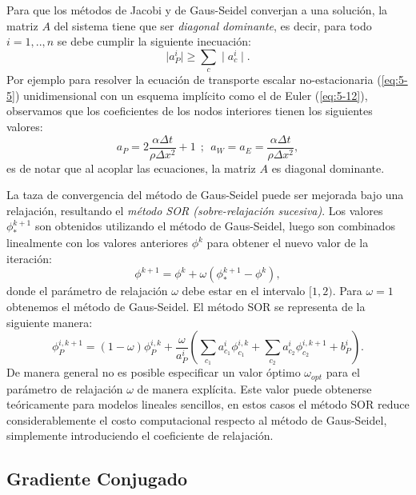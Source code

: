 \documentclass[a4paper,10pt, oneside]{book}
\begin{document}
Para que los métodos de Jacobi y de Gaus-Seidel converjan a una solución, la matriz $A$ del sistema tiene que ser \textit{diagonal dominante}, es decir, para todo $i=1,..,n$ se debe cumplir la siguiente inecuación:
\begin{equation}
	\mid a_P^i \mid \geq \sum_c \mid a_c^i \mid. \nonumber
\end{equation}
Por ejemplo para resolver la ecuación de transporte escalar no-estacionaria (\ref{eq:5-5}) unidimensional con un esquema implícito como el de Euler (\ref{eq:5-12}), observamos que los coeficientes de los nodos interiores tienen los siguientes valores:
\begin{equation}
a_P = 2 \frac{\alpha \Delta t}{ \rho \Delta x^2} + 1 ~~ ;~~ a_W = a_E = \frac{\alpha \Delta t}{ \rho \Delta x^2}, \nonumber
\end{equation}
es de notar que al acoplar las ecuaciones, la matriz $A$ es diagonal dominante. 

La taza de convergencia del método de Gaus-Seidel puede ser mejorada bajo una relajación, resultando el \textit{método SOR (sobre-relajación sucesiva)}. Los valores $\phi_*^{k+1}$ son obtenidos utilizando el método de Gaus-Seidel, luego son combinados linealmente con los valores anteriores $\phi^k$ para obtener el nuevo valor de la iteración:
\begin{equation}
	\phi^{k+1} = \phi^k + \omega (\phi_*^{k+1} - \phi^k), \nonumber
\end{equation}
donde el parámetro de relajación $\omega$ debe estar en el intervalo $[1,2)$. Para $\omega = 1$ obtenemos el método de Gaus-Seidel. El método SOR se representa de la siguiente manera:
\begin{equation}
	\phi_P^{i,k+1} = (1-\omega)\phi_P^{i,k} + \frac{\omega}{a_P^i} \left( \sum_{c_1} a^i_{c_1} \phi_{c_1}^{i,k} + \sum_{c_2} a_{c_2}^i \phi_{c_2}^{i,k+1} + b_P^i \right).
\end{equation}
De manera general no es posible especificar un valor óptimo $\omega_{opt}$ para el parámetro de relajación $\omega$ de manera explícita. Este valor puede obtenerse teóricamente para modelos lineales sencillos, en estos casos el método SOR reduce considerablemente el costo computacional respecto al método de Gaus-Seidel, simplemente introduciendo el coeficiente de relajación.

\subsection{Gradiente Conjugado}
\end{document}
